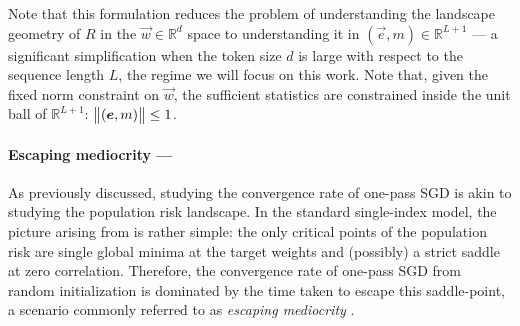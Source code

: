 Note that this formulation reduces the problem of understanding the landscape geometry of $R$ in the $\vec{w}\in\mathbb{R}^{d}$ space to understanding it in $(\vec{e},m)\in\mathbb{R}^{L+1}$ --- a significant simplification when the token size $d$ is large with respect to the sequence length $L$, the regime we will focus on this work.
Note that, given the fixed norm constraint on \(\vec{w}\), the sufficient statistics are constrained inside the unit ball of \(\mathbb{R}^{L+1}\): \(\left\lVert ({\boldsymbol{e}}, m)\right\rVert\leq 1\). 

\paragraph{Escaping mediocrity ---} As previously discussed, studying the convergence rate of one-pass SGD is akin to studying the population risk landscape. In the standard single-index model, the picture arising from \citep{arous2021online,arnaboldi2024escaping} is rather simple: the only critical points of the population risk are single global minima at the target weights and (possibly) a strict saddle at zero correlation. Therefore, the convergence rate of one-pass SGD from random initialization is dominated by the time taken to escape this saddle-point, a scenario commonly referred to as \emph{escaping mediocrity} \citep{arnaboldi2024escaping}. 

